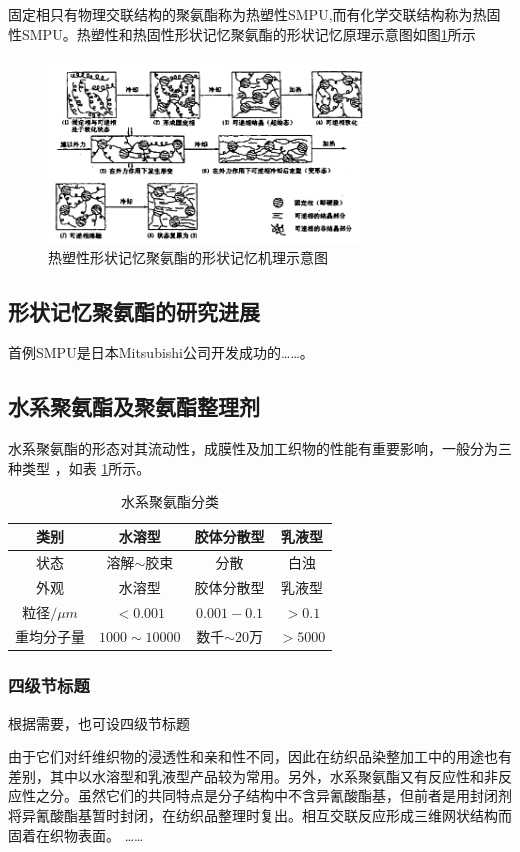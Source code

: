 固定相只有物理交联结构的聚氨酯称为热塑性SMPU,而有化学交联结构称为热固性SMPU。热塑性和热固性形状记忆聚氨酯的形状记忆原理示意图如图\ref{fig:diagram}所示

\begin{figure}
 \centering
 \includegraphics[width=0.75\textwidth]{figures/figure1}
 \caption{热塑性形状记忆聚氨酯的形状记忆机理示意图}\label{fig:diagram}
\end{figure}


\subsection{形状记忆聚氨酯的研究进展}
首例SMPU是日本Mitsubishi公司开发成功的……。

\subsection{水系聚氨酯及聚氨酯整理剂}

水系聚氨酯的形态对其流动性，成膜性及加工织物的性能有重要影响，一般分为三种类型\cite{Jiang2005Size} ，如表 \ref{tab:category}所示。

\begin{table}
  \centering
  \caption{水系聚氨酯分类} \label{tab:category}
  \begin{tabular*}{0.9\textwidth}{@{\extracolsep{\fill}}cccc}
  \toprule
    类别			&水溶型		&胶体分散型		&乳液型 \\
  \midrule
    状态			&溶解$\sim$胶束	&分散		&白浊 \\
    外观			&水溶型		&胶体分散型		&乳液型 \\
    粒径$/\mu m$	&$<0.001$		&$0.001-0.1$		&$>0.1$ \\
    重均分子量	&$1000\sim 10000$	&数千$\sim 20万$ &$>5000$ \\
  \bottomrule
  \end{tabular*}
\end{table}

\subsubsection{四级节标题}

根据需要，也可设四级节标题

由于它们对纤维织物的浸透性和亲和性不同，因此在纺织品染整加工中的用途也有差别，其中以水溶型和乳液型产品较为常用。另外，水系聚氨酯又有反应性和非反应性之分。虽然它们的共同特点是分子结构中不含异氰酸酯基，但前者是用封闭剂将异氰酸酯基暂时封闭，在纺织品整理时复出。相互交联反应形成三维网状结构而固着在织物表面。
……


